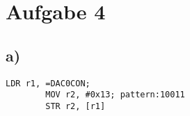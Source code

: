 \section{Aufgabe 4}	%
\subsection{a)}
\begin{lstlisting}[caption={Spannungsbereich und DAC Takt setzten}, label=lst:SpannungTakt, frame=tlrb]
		LDR r1, =DAC0CON;
		MOV r2, #0x13; pattern:10011 
		STR r2, [r1]
\end{lstlisting}

